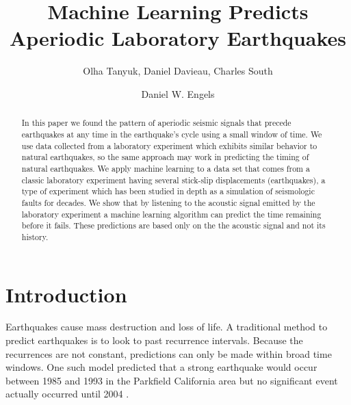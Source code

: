 \documentclass[]{llncs} %
\begin{document}

\title{Machine Learning Predicts Aperiodic Laboratory Earthquakes}
\author{Olha Tanyuk, Daniel Davieau, Charles South \and Daniel W. Engels}


\maketitle
\begin{abstract}
In this paper we found the pattern of aperiodic seismic signals that precede earthquakes at any time in the earthquake’s cycle using a small window of time. We use data collected from a laboratory experiment which exhibits similar behavior to natural earthquakes, so the same approach may work in predicting the timing of natural earthquakes. We apply machine learning to a data set that comes from a classic laboratory experiment having several stick-slip displacements (earthquakes), a type of experiment which has been studied in depth as a simulation of seismologic faults for decades. We show that by listening to the acoustic signal emitted by the laboratory experiment a machine learning algorithm can predict the time remaining before it fails. These predictions are based only on the the acoustic signal and not its history. \par
	
\end{abstract}

\section{Introduction}
Earthquakes cause mass destruction and loss of life. A traditional method to predict earthquakes is to look to past recurrence intervals. Because the recurrences are not constant, predictions can only be made within broad time windows. One such model predicted that a strong earthquake would occur between 1985 and 1993 in the Parkfield California area but no significant event actually occurred until 2004 \cite{Jackson}. \par
\end{document}
